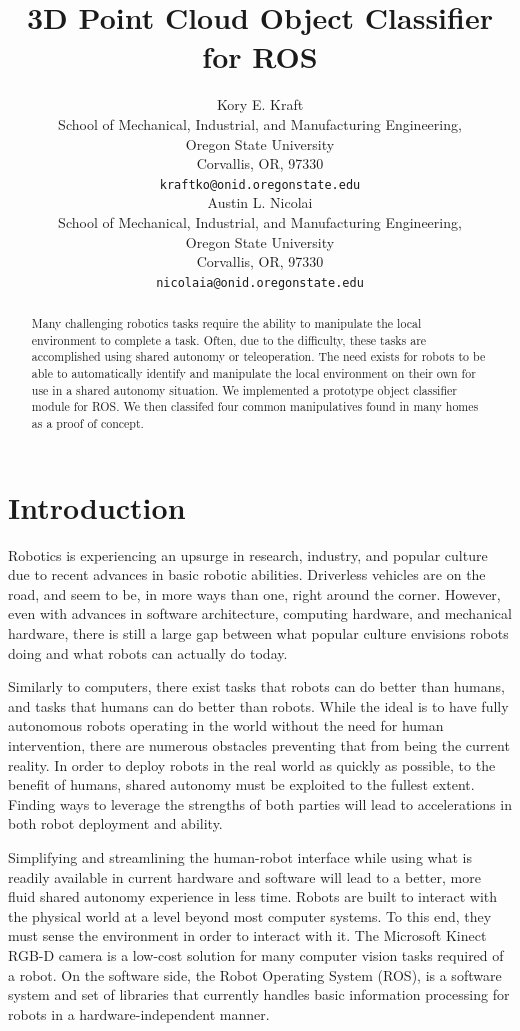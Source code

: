 \documentclass{article}
\title{\LARGE \bf 
3D Point Cloud Object Classifier for ROS
}
\author{
Kory E. Kraft\\
School of Mechanical, Industrial, and Manufacturing Engineering,\\
Oregon State University\\
Corvallis, OR, 97330\\
\texttt{kraftko@onid.oregonstate.edu} \\
\And
Austin L. Nicolai\\
School of Mechanical, Industrial, and Manufacturing Engineering,\\
Oregon State University\\
Corvallis, OR, 97330\\
\texttt{nicolaia@onid.oregonstate.edu} \\
}
\begin{document}
\maketitle
\thispagestyle{empty}
\pagestyle{empty}
\begin{abstract}
Many challenging robotics tasks require the ability to manipulate the local environment to complete a
task. Often, due to the difficulty, these tasks are accomplished using shared autonomy or teleoperation.
The need exists for robots to be able to automatically identify and manipulate the local environment on
their own for use in a shared autonomy situation. We implemented a prototype object classifier module for ROS. 
We then classifed four common manipulatives found in many homes as a proof of concept.  
\end{abstract}


\section{Introduction}
Robotics is experiencing an upsurge in research, industry, and popular culture due to 
recent advances in basic robotic abilities.  Driverless vehicles are on the road, and seem to be, in more ways than 
one, right around the corner. However, even with advances in software architecture,
computing hardware, and mechanical hardware, there is still a large gap between what popular culture
 envisions robots doing and what robots can actually do today.

Similarly to computers, there exist tasks that robots can do better than humans, and tasks that humans can do
better than robots. While the ideal is to have fully autonomous robots operating in the world without the need for human intervention, 
there are numerous obstacles preventing that from being the current reality. In order to deploy robots in the real world as quickly as possible, to the benefit of humans, shared autonomy must be exploited to the fullest extent. Finding ways to leverage the strengths of both parties will lead to accelerations in both robot deployment and ability.

Simplifying and streamlining the human-robot interface while using what is readily available in current hardware and software will lead to a better, more fluid shared autonomy experience in less time. Robots are built to interact with the physical world at a level beyond most computer systems. To this end, they must sense the environment in order to interact with it. The Microsoft Kinect RGB-D camera is a low-cost solution for many computer vision tasks required of a robot. On the software side, the Robot Operating System (ROS), is a software system and set of libraries that currently handles basic information processing for robots in a hardware-independent manner.
\end{document}
